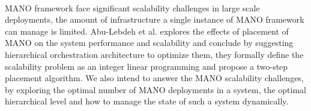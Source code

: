 \paragraph{}
MANO framework face significant scalability challenges in large scale deployments, the amount of infrastructure a single instance of MANO framework can manage is limited. Abu-Lebdeh et al. \cite{abu-lebdeh_nfv_2017} explores the effects of placement of MANO on the system performance and scalability and conclude by suggesting hierarchical orchestration architecture to optimize them, they formally define the scalability problem as an integer linear programming and propose a two-step placement algorithm. We also intend to answer the MANO scalability challenges, by exploring the optimal number of MANO deployments in a system, the optimal hierarchical level and how to manage the state of such a system dynamically.
